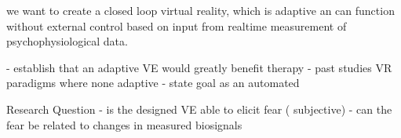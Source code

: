 we want to create a closed loop virtual reality, which is adaptive an can function without external control based on input from realtime measurement of psychophysiological data.

- establish that an adaptive VE would greatly benefit therapy
- past studies VR paradigms where none adaptive
- state goal as an automated 




Research Question
- is the designed VE able to elicit fear ( subjective)
- can the fear be related to changes in measured biosignals





% 
%
%
%
